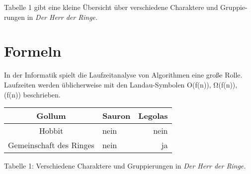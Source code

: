\documentclass[a4paper,10pt]{article}
\begin{document}
Tabelle 1 gibt eine kleine Übersicht über verschiedene Charaktere und Gruppie- rungen in \textit{Der Herr der Ringe.}

\section {Formeln}

In der Informatik spielt die Laufzeitanalyse von Algorithmen eine große Rolle. 
Laufzeiten werden üblicherweise mit den Landau-Symbolen O(f(n)), \si{\ohm}(f(n)), \si{\theta}(f(n)) beschrieben.


\begin{tabular}{||c||l|r||}
\hline 
 Gollum				&Sauron		&Legolas	\\	
\hline
Hobbit								&nein			&nein\\
\hline
Gemeinschaft des Ringes 	&nein 		&ja				\\
\hline
\end{tabular}%

Tabelle 1: Verschiedene Charaktere und Gruppierungen in \textit{Der Herr der Ringe.}
\end{document}
